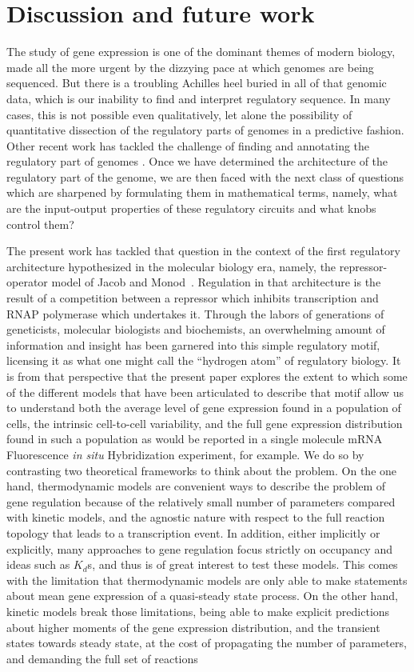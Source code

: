 \section{Discussion and future work}

The study of gene expression is one of the dominant themes of modern biology,
made all the more urgent by the dizzying pace at which genomes are being
sequenced. But there is a troubling Achilles heel buried in all of that genomic
data, which is our inability to find and interpret regulatory sequence. In
many cases, this is not possible even qualitatively, let alone the possibility
of quantitative dissection of the regulatory parts of genomes in a predictive
fashion. Other recent work has tackled the challenge of finding and annotating
the regulatory part of genomes \cite{Belliveau2018, Ireland2020}. Once we have
determined the architecture of the regulatory part of the genome, we are then
faced with the next class of questions which are sharpened by formulating them
in mathematical terms, namely, what are the input-output properties of these
regulatory circuits and what knobs control them?

The present work has tackled that question in the context of the first
regulatory architecture hypothesized in the molecular biology era, namely, the
repressor-operator model of Jacob and Monod~\cite{Jacob1961}. Regulation in that
architecture is the result of a competition between a repressor which inhibits
transcription and RNAP polymerase which undertakes it. Through the labors of
generations of geneticists, molecular biologists and biochemists, an
overwhelming amount of information and insight has been garnered into this
simple regulatory motif, licensing it as what one might call the ``hydrogen
atom'' of regulatory biology. It is from that perspective that the present paper
explores the extent to which some of the different models that have been
articulated to describe that motif allow us to understand both the average level
of gene expression found in a population of cells, the intrinsic cell-to-cell
variability, and the full gene expression distribution found in such a population
as would be reported in a single molecule mRNA Fluorescence \textit{in situ}
Hybridization experiment, for example.
We do so by contrasting two theoretical frameworks to think about the problem.
On the one hand, thermodynamic models are convenient ways to describe the
problem of gene regulation because of the relatively small number of parameters
compared with kinetic models, and the agnostic nature with respect to the full
reaction topology that leads to a transcription event. In addition, either
implicitly or explicitly, many approaches to gene regulation focus strictly on
occupancy and ideas such as $K_d$s, and thus is of great interest to test these
models. This comes with the limitation that thermodynamic models are only able
to make statements about mean gene expression of a quasi-steady state process.
On the other hand, kinetic models break those limitations, being able to make
explicit predictions about higher moments of the gene expression distribution,
and the transient states towards steady state, at the cost of propagating the
number of parameters, and demanding the full set of reactions


